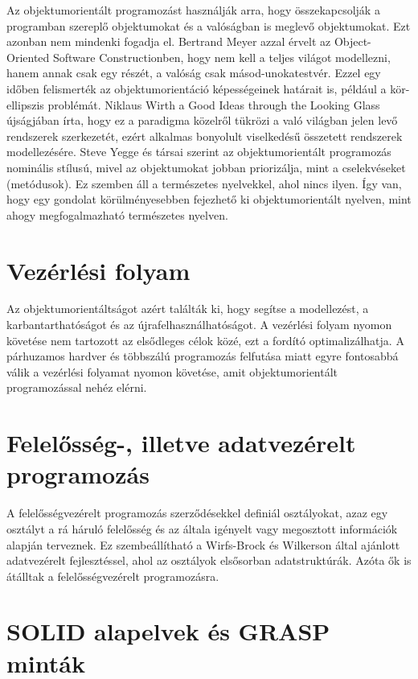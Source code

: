 \documentclass[]{thesis-ekf}
\theoremstyle{definition}
\begin{document}
	Az objektumorientált programozást használják arra, hogy összekapcsolják a programban szereplő objektumokat és a valóságban is meglevő objektumokat. Ezt azonban nem mindenki fogadja el. Bertrand Meyer azzal érvelt az Object-Oriented Software Constructionben, hogy nem kell a teljes világot modellezni, hanem annak csak egy részét, a valóság csak másod-unokatestvér. Ezzel egy időben felismerték az objektumorientáció képességeinek határait is, például a kör-ellipszis problémát.
	Niklaus Wirth a Good Ideas through the Looking Glass újságjában írta, hogy ez a paradigma közelről tükrözi a való világban jelen levő rendszerek szerkezetét, ezért alkalmas bonyolult viselkedésű összetett rendszerek modellezésére.
	Steve Yegge és társai szerint az objektumorientált programozás nominális stílusú, mivel az objektumokat jobban priorizálja, mint a cselekvéseket (metódusok). Ez szemben áll a természetes nyelvekkel, ahol nincs ilyen. Így van, hogy egy gondolat körülményesebben fejezhető ki objektumorientált nyelven, mint ahogy megfogalmazható természetes nyelven.
	
	\section{Vezérlési folyam}
	
	Az objektumorientáltságot azért találták ki, hogy segítse a modellezést, a karbantarthatóságot és az újrafelhasználhatóságot. A vezérlési folyam nyomon követése nem tartozott az elsődleges célok közé, ezt a fordító optimalizálhatja. A párhuzamos hardver és többszálú programozás felfutása miatt egyre fontosabbá válik a vezérlési folyamat nyomon követése, amit objektumorientált programozással nehéz elérni.
	
	\section{Felelősség-, illetve adatvezérelt programozás}
	
	A felelősségvezérelt programozás szerződésekkel definiál osztályokat, azaz egy osztályt a rá háruló felelősség és az általa igényelt vagy megosztott információk alapján terveznek. Ez szembeállítható a Wirfs-Brock és Wilkerson által ajánlott adatvezérelt fejlesztéssel, ahol az osztályok elsősorban adatstruktúrák. Azóta ők is átálltak a felelősségvezérelt programozásra.
	
	\section{SOLID alapelvek és GRASP minták}
	
\end{document}
